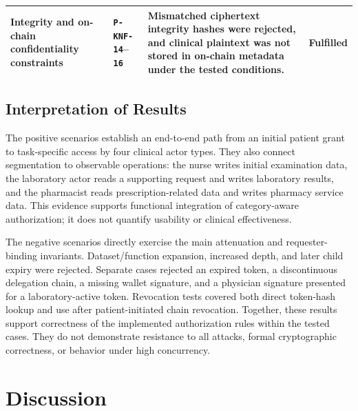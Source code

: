 \begin{table}[t]
\begin{tabular}{@{}p{}p{}p{}p{}@{}}
		Integrity and on-chain confidentiality constraints                                                                                             &
		\texttt{P-KNF-14}--\texttt{16}                                                                                                                 &
		Mismatched ciphertext integrity hashes were rejected, and clinical plaintext was not stored in on-chain metadata under the tested conditions.  &
		Fulfilled                                                                                                                                                                                                                              \\
		\bottomrule
	\end{tabular}
\end{table}

\subsection{Interpretation of Results}

The positive scenarios establish an end-to-end path from an initial patient grant to task-specific access by four clinical actor types. They also connect segmentation to observable operations: the nurse writes initial examination data, the laboratory actor reads a supporting request and writes laboratory results, and the pharmacist reads prescription-related data and writes pharmacy service data. This evidence supports functional integration of category-aware authorization; it does not quantify usability or clinical effectiveness.

The negative scenarios directly exercise the main attenuation and requester-binding invariants. Dataset/function expansion, increased depth, and later child expiry were rejected. Separate cases rejected an expired token, a discontinuous delegation chain, a missing wallet signature, and a physician signature presented for a laboratory-active token. Revocation tests covered both direct token-hash lookup and use after patient-initiated chain revocation. Together, these results support correctness of the implemented authorization rules within the tested cases. They do not demonstrate resistance to all attacks, formal cryptographic correctness, or behavior under high concurrency.

\section{Discussion}
\label{sec:discussion}

